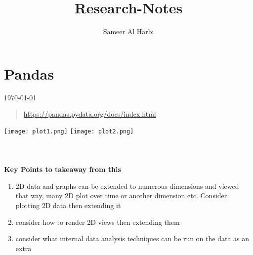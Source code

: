 \documentclass{paper}
\title{Research-Notes}
\author{Sameer Al Harbi}
\begin{document}
\part{Pandas}
\today
\begin{quote}
\url{https://pandas.pydata.org/docs/index.html}
\end{quote}
\texttt{[image: plot1.png]}
\texttt{[image: plot2.png]}
\\
\\
\\
\\
\textbf{Key Points to takeaway from this}
\begin{enumerate}
    \item 2D data and graphs can be extended to numerous dimensions and viewed that way, many 2D plot over time or another dimension etc. Consider plotting 2D data then extending it
    \item consider how to render 2D views then extending them 
    \item consider what internal data analysis techniques can be run on the data as an extra
    
\end{enumerate}
\end{document}
